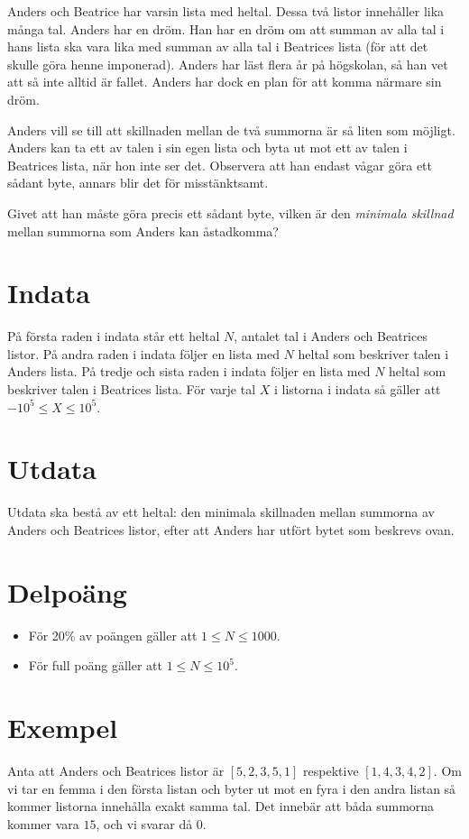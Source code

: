
Anders och Beatrice har varsin lista med heltal. Dessa två listor innehåller lika många tal. Anders har en dröm. Han har en dröm om att summan av alla tal i hans lista ska vara lika med summan av alla tal i Beatrices lista (för att det skulle göra henne imponerad). Anders har läst flera år på högskolan, så han vet att så inte alltid är fallet. Anders har dock en plan för att komma närmare sin dröm.

Anders vill se till att skillnaden mellan de två summorna är så liten som möjligt. Anders kan ta ett av talen i sin egen lista och byta ut mot ett av talen i Beatrices lista, när hon inte ser det. Observera att han endast vågar göra ett sådant byte, annars blir det för misstänktsamt.

Givet att han måste göra precis ett sådant byte, vilken är den \emph{minimala skillnad} mellan summorna som Anders kan åstadkomma?

\section*{Indata}
På första raden i indata står ett heltal $N$, antalet tal i Anders och Beatrices listor. På andra raden i indata följer en lista med $N$ heltal som beskriver talen i Anders lista. På tredje och sista raden i indata följer en lista med $N$ heltal som beskriver talen i Beatrices lista. För varje tal $X$ i listorna i indata så gäller att $-10^5 \leq X \leq 10^5$.

\section*{Utdata}
Utdata ska bestå av ett heltal: den minimala skillnaden mellan summorna av Anders och Beatrices listor, efter att Anders har utfört bytet som beskrevs ovan.

\section*{Delpoäng}
\begin{itemize}
\item För 20\% av poängen gäller att $1 \leq N \leq 1000$.
\item För full poäng gäller att $1 \leq N \leq 10^{5}$.
\end{itemize}

\section*{Exempel}
Anta att Anders och Beatrices listor är $[5,2,3,5,1]$ respektive $[1,4,3,4,2]$. Om vi tar en femma i den första listan och byter ut mot en fyra i den andra listan så kommer listorna innehålla exakt samma tal. Det innebär att båda summorna kommer vara $15$, och vi svarar då $0$.
